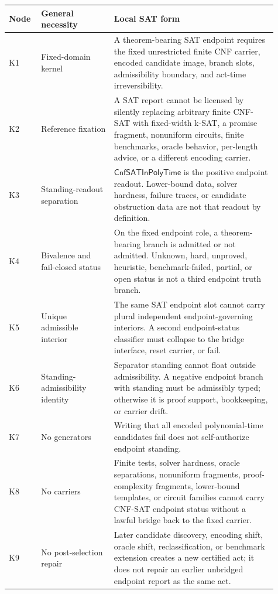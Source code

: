 \documentclass[11pt]{article}
\theoremstyle{definition}
\theoremstyle{remark}
\newcommand{\CnfSATP}{\mathsf{CnfSATInPolyTime}}
\begin{document}
\begin{longtable}{>{\raggedright\arraybackslash}p{0.10\linewidth}>{\raggedright\arraybackslash}p{0.25\linewidth}>{\raggedright\arraybackslash}p{0.56\linewidth}}
\toprule
Node & General necessity & Local SAT form \\
\midrule
K1 & Fixed-domain kernel & A theorem-bearing SAT endpoint requires the fixed unrestricted finite CNF carrier, encoded candidate image, branch slots, admissibility boundary, and act-time irreversibility. \\
K2 & Reference fixation & A SAT report cannot be licensed by silently replacing arbitrary finite CNF-SAT with fixed-width k-SAT, a promise fragment, nonuniform circuits, finite benchmarks, oracle behavior, per-length advice, or a different encoding carrier. \\
K3 & Standing-readout separation & \(\CnfSATP\) is the positive endpoint readout. Lower-bound data, solver hardness, failure traces, or candidate obstruction data are not that readout by definition. \\
K4 & Bivalence and fail-closed status & On the fixed endpoint role, a theorem-bearing branch is admitted or not admitted. Unknown, hard, unproved, heuristic, benchmark-failed, partial, or open status is not a third endpoint truth branch. \\
K5 & Unique admissible interior & The same SAT endpoint slot cannot carry plural independent endpoint-governing interiors. A second endpoint-status classifier must collapse to the bridge interface, reset carrier, or fail. \\
K6 & Standing-admissibility identity & Separator standing cannot float outside admissibility. A negative endpoint branch with standing must be admissibly typed; otherwise it is proof support, bookkeeping, or carrier drift. \\
K7 & No generators & Writing that all encoded polynomial-time candidates fail does not self-authorize endpoint standing. \\
K8 & No carriers & Finite tests, solver hardness, oracle separations, nonuniform fragments, proof-complexity fragments, lower-bound templates, or circuit families cannot carry CNF-SAT endpoint status without a lawful bridge back to the fixed carrier. \\
K9 & No post-selection repair & Later candidate discovery, encoding shift, oracle shift, reclassification, or benchmark extension creates a new certified act; it does not repair an earlier unbridged endpoint report as the same act. \\

\end{longtable}
\end{document}
